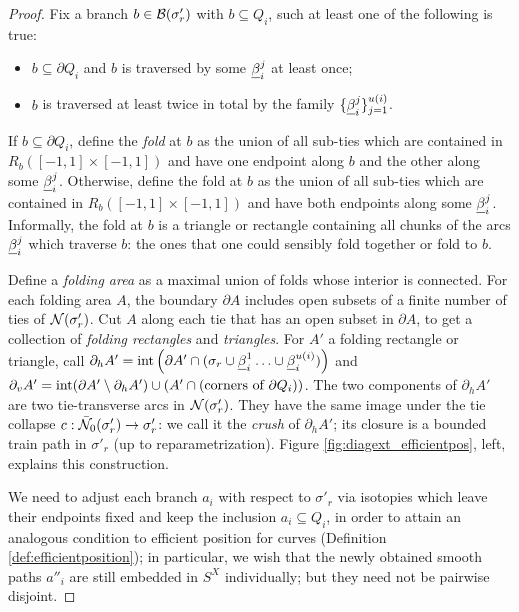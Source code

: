 \begin{proof}
Fix a branch $b\in\mathcal B(\sigma'_r)$ with $b\subseteq Q_i$, such at least one of the following is true:
\begin{itemize}
\item $b\subseteq\partial Q_i$ and $b$ is traversed by some $\underline{\beta}_i^j$ at least once;
\item $b$ is traversed at least twice in total by the family $\{\underline{\beta}_i^j\}_{j=1}^{u(i)}$.
\end{itemize}
If $b\subseteq \partial Q_i$, define the \emph{fold} at $b$ as the union of all sub-ties which are contained in $R_b([-1,1]\times[-1,1])$ and have one endpoint along $b$ and the other along some $\underline{\beta}_i^j$. Otherwise, define the fold at $b$ as the union of all sub-ties which are contained in $R_b([-1,1]\times[-1,1])$ and have both endpoints along some $\underline{\beta}_i^j$. Informally, the fold at $b$ is a triangle or rectangle containing all chunks of the arcs $\underline{\beta}_i^j$ which traverse $b$: the ones that one could sensibly fold together or fold to $b$.

Define a \emph{folding area} as a maximal union of folds whose interior is connected. For each folding area $A$, the boundary $\partial A$ includes open subsets of a finite number of ties of ${\mathcal N}(\sigma'_r)$. Cut $A$ along each tie that has an open subset in $\partial A$, to get a collection of \emph{folding rectangles} and \emph{triangles}. For $A'$ a folding rectangle or triangle, call $\partial_h A'=\mathrm{int}\left(\partial A'\cap(\sigma_r\cup \underline{\beta}_i^1\ldots \cup\underline{\beta}_i^{u(i)})\right)$ and $\partial_v A'=\mathrm{int}(\partial A'\setminus \partial_h A')\cup \left(A'\cap (\text{corners of }\partial Q_i)\right)$. The two components of $\partial_h A'$ are two tie-transverse arcs in ${\mathcal N}(\sigma'_r)$. They have the same image under the tie collapse $c:\bar{{\mathcal N}}_0(\sigma'_r)\rightarrow \sigma'_r$: we call it the \emph{crush} of $\partial_h A'$; its closure is a bounded train path in $\sigma'_r$ (up to reparametrization). Figure \ref{fig:diagext_efficientpos}, left, explains this construction.

We need to adjust each branch $a_i$ with respect to $\sigma'_r$ via isotopies which leave their endpoints fixed and keep the inclusion $a_i\subseteq Q_i$, in order to attain an analogous condition to efficient position for curves (Definition \ref{def:efficientposition}); in particular, we wish that the newly obtained smooth paths $a''_i$ are still embedded in $S^X$ individually; but they need not be pairwise disjoint.


\end{proof}
